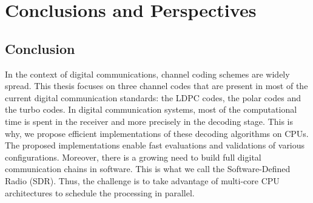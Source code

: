 
\graphicspath{{main/conclusion/fig/}}

\chapter*{Conclusions and Perspectives}

\section*{Conclusion}

In the context of digital communications, channel coding schemes are widely
spread. This thesis focuses on three channel codes that are present in most of
the current digital communication standards: the LDPC codes, the polar codes and
the turbo codes. In digital communication systems, most of the computational
time is spent in the receiver and more precisely in the decoding stage. This is
why, we propose efficient implementations of these decoding algorithms on CPUs.
The proposed implementations enable fast evaluations and validations of various
configurations. Moreover, there is a growing need to build full digital
communication chains in software. This is what we call the Software-Defined
Radio (SDR). Thus, the challenge is to take advantage of multi-core CPU
architectures to schedule the processing in parallel.

